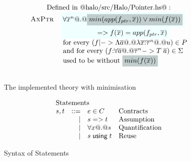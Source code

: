 \begin{figure}
{\[\begin{array}{c}
\begin{array}{lll}
 \multicolumn{2}{c}{\mbox{Defined in @halo/src/Halo/Pointer.hs@}:} \\
 \textsc{AxPtr}  & \formula{\forall \oln{x}{n} @.@ \highlight{min(app(f_{ptr},\xs)) \lor min(f(\ol{x}))}} \\
                 & \formula{\quad\qquad\qquad => f(\ol{x}) = app(f_{ptr},\xs)} \\
                 & \text{ for every } (f |-> \Lambda\as @.@ \lambda\oln{x{:}\tau}{n} @.@ u) \in P \\
                 & \text{ and for every } (f{:}\forall\as @.@ \oln{\tau}{n} -> T\;\as) \in \Sigma \\
                 & \text{ used to be without $\highlight{min(f(\ol{x}))}$ } \\ \\
\end{array}
\end{array}\]}
\caption{The implemented theory with minimisation}\label{fig:min-theory}
\end{figure}

\begin{figure}
\[\begin{array}{c}
\begin{array}{lrll}
\multicolumn{3}{l}{\text{Statements}} \\
  s,t & ::=  & e \in C                    & \text{Contracts} \\
      & \mid & s => t                     & \text{Assumption} \\
      & \mid & \forall x @.@ s            & \text{Quantification} \\
      & \mid & s \; \textsf{using} \; t   & \text{Reuse}
\end{array}
\end{array}\]
\caption{Syntax of Statements}\label{fig:fol-image}
\end{figure}

